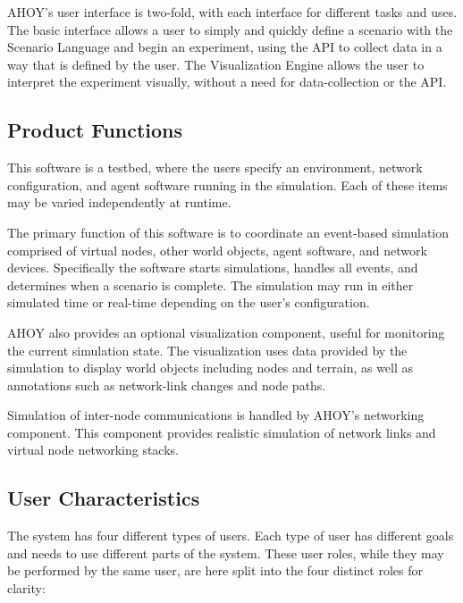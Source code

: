 \documentclass[titlepage]{article}
\begin{document}
AHOY's user interface is two-fold, with each interface for different tasks and uses. The basic interface allows a user to simply and quickly define a scenario with the Scenario Language and begin an experiment, using the API to collect data in a way that is defined by the user. The Visualization Engine allows the user to interpret the experiment visually, without a need for data-collection or the API.


\subsection{Product Functions%
  \label{product-functions}%
}

This software is a testbed, where the users specify an environment, network configuration, and agent software running in
the simulation. Each of these items may be varied independently at runtime.

The primary function of this software is to coordinate an event-based simulation comprised of virtual nodes, other world objects,
agent software, and network devices.  Specifically the software starts simulations, handles all events, and determines
when a scenario is complete.  The simulation may run in either simulated time or real-time depending on the user's
configuration.

AHOY also provides an optional visualization component, useful for monitoring the current simulation state.  The
visualization uses data provided by the simulation to display world objects including nodes and terrain, as well as
annotations such as network-link changes and node paths.

Simulation of inter-node communications is handled by AHOY's networking component.  This component provides realistic
simulation of network links and virtual node networking stacks.



\subsection{User Characteristics%
  \label{user-characteristics}%
}

The system has four different types of users.  Each type of user has different goals and needs to use different parts of the system.  These user roles, while they may be performed by the same user, are here split into the four distinct roles for clarity:
\end{document}
